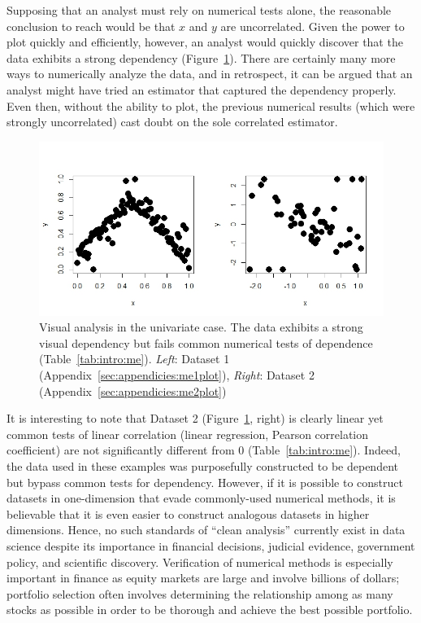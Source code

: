 Supposing that an analyst must rely on numerical tests alone, the reasonable conclusion to reach would be that $x$ and $y$ are uncorrelated. Given the power to plot quickly and efficiently, however, an analyst would quickly discover that the data exhibits a strong dependency (Figure~\ref{fig:intro:meplot}). There are certainly many more ways to numerically analyze the data, and in retrospect, it can be argued that an analyst might have tried an estimator that captured the dependency properly. Even then, without the ability to plot, the previous numerical results (which were strongly uncorrelated) cast doubt on the sole correlated estimator.

\begin{figure}[htb]
	\begin{center}
		\includegraphics[width=1\linewidth]{ch-intro/figures/me}
		\caption[Visual analysis in the univariate case.]{Visual analysis in the univariate case. The data exhibits a strong visual dependency but fails common numerical tests of dependence (Table~\ref{tab:intro:me}). \textit{Left}: Dataset 1 (Appendix~\ref{sec:appendicies:me1plot}), \textit{Right}: Dataset 2 (Appendix~\ref{sec:appendicies:me2plot})}
		\label{fig:intro:meplot}
	\end{center}
\end{figure}

It is interesting to note that Dataset 2 (Figure~\ref{fig:intro:meplot}, right) is clearly linear yet common tests of linear correlation (linear regression, Pearson correlation coefficient) are not significantly different from 0 (Table~\ref{tab:intro:me}). Indeed, the data used in these examples was purposefully constructed to be dependent but bypass common tests for dependency. However, if it is possible to construct datasets in one-dimension that evade commonly-used numerical methods, it is believable that it is even easier to construct analogous datasets in higher dimensions. Hence, no such standards of ``clean analysis'' currently exist in data science despite its importance in financial decisions, judicial evidence, government policy, and scientific discovery. Verification of numerical methods is especially important in finance as equity markets are large and involve billions of dollars; portfolio selection often involves determining the relationship among as many stocks as possible in order to be thorough and achieve the best possible portfolio. 